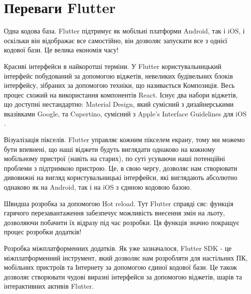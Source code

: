 \section{Переваги Flutter}
\label{sec:flutter_pros}
\begin{enumerate}
    \begin{item}
        Одна кодова база.
        Flutter підтримує як мобільні платформи Android, так і iOS, і оскільки він відображає все самостійно, він дозволяє запускати все з однієї кодової бази.
        Це велика економія часу!
    \end{item}
    \begin{item}
        Красиві інтерфейси в найкоротші терміни.
        У Flutter користувальницький інтерфейс побудований за допомогою віджетів, невеликих будівельних блоків інтерфейсу, зібраних за допомогою техніки, що називається Композиція.
        Весь процес схожий на використання компонентів React.
        Існує два набори віджетів, що доступні нестандартно: Material Design, який сумісний з дизайнерськими вказівками Google, та Cupertino, сумісний з Apple's Interface Guidelines для iOS .
    \end{item}
    \begin{item}
        Візуалізація пікселів.
        Flutter управляє кожним пікселем екрану, тому ми можемо бути впевнені, що наші віджети будуть виглядати однаково на кожному мобільному пристрої (навіть на старих), по суті усуваючи наші потенційні проблеми з підтримкою пристрою.
        Це, в свою чергу, дозволяє нам створювати дивовижні на вигляд користувальницькі інтерфейси, які виглядають абсолютно однаково як на Android, так і на iOS з єдиною кодовою базою.
    \end{item}
    \begin{item}
        Швидша розробка за допомогою Hot reload.
        Тут Flutter справді сяє: функція гарячого перезавантаження забезпечує можливість внесення змін на льоту, дозволяючи побачити їх відразу під час розробки.
        Ця функція значно покращує процес розробки додатків!
    \end{item}
    \begin{item}
        Розробка міжплатформенних додатків.
        Як уже зазначалося, Flutter SDK - це міжплатформенний інструмент, який дозволяє нам розробляти для настільних ПК, мобільних пристроїв та Інтернету за допомогою єдиної кодової бази.
        Це також дозволяє створювати чудові виразні інтерфейси за допомогою віджетів, шарів та інтерактивних активів Flutter.
    \end{item}
\end{enumerate}


